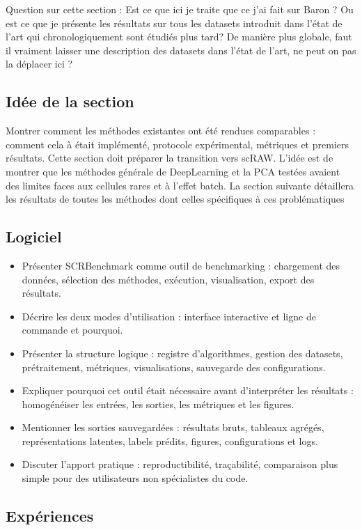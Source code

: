 Question sur cette section : Est ce que ici je traite que ce j'ai fait sur Baron ? Ou est ce que je présente les résultats sur tous les datasets introduit dans l'état de l'art qui chronologiquement sont étudiés plus tard? De manière plus globale, faut il vraiment laisser une description des datasets dans l'état de l'art, ne peut on pas la déplacer ici ?

\subsection*{Idée de la section}
Montrer comment les méthodes existantes ont été rendues comparables : comment cela à était implémenté, protocole expérimental, métriques et premiers résultats. Cette section doit préparer la transition vers scRAW. L'idée est de montrer que les méthodes générale de DeepLearning et la PCA testées avaient des limites faces aux cellules rares et à l'effet batch. La section suivante détaillera les résultats de toutes les méthodes dont celles spécifiques à ces problématiques

\subsection{Logiciel}
\begin{itemize}
  \item Présenter SCRBenchmark comme outil de benchmarking : chargement des données, sélection des méthodes, exécution, visualisation, export des résultats.
  \item Décrire les deux modes d'utilisation : interface interactive et ligne de commande et pourquoi.
  \item Présenter la structure logique : registre d'algorithmes, gestion des datasets, prétraitement, métriques, visualisations, sauvegarde des configurations.
  \item Expliquer pourquoi cet outil était nécessaire avant d'interpréter les résultats : homogénéiser les entrées, les sorties, les métriques et les figures.
  \item Mentionner les sorties sauvegardées : résultats bruts, tableaux agrégés, représentations latentes, labels prédits, figures, configurations et logs.
  \item Discuter l'apport pratique : reproductibilité, traçabilité, comparaison plus simple pour des utilisateurs non spécialistes du code.
\end{itemize}

\subsection{Expériences}

